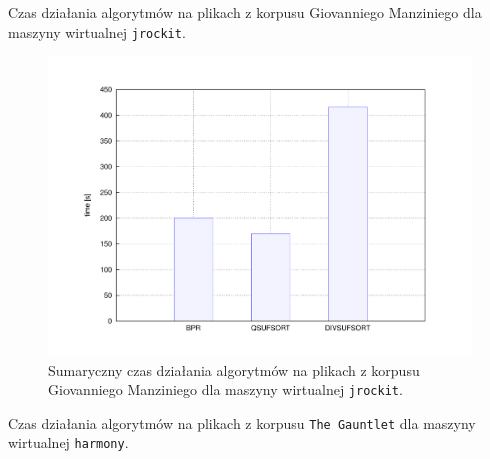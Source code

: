 \begin{table}[p]
	\begin{center}        
 		 
    \end{center}                         
\caption{Czas działania algorytmów na plikach z korpusu Giovanniego Manziniego dla maszyny wirtualnej \texttt{jrockit}.}%
    \label{tab:jrockit-manzini}
\end{table}

\begin{figure}[p]
       \begin{center}
            \includegraphics[width=\linewidth]{figures/results/jrockit-manzini.pdf}
        \end{center}        
	    \caption{Sumaryczny czas działania algorytmów na plikach z korpusu Giovanniego Manziniego dla maszyny wirtualnej \texttt{jrockit}.}%
    \label{rys:jrockit-manzini}
\end{figure} 


\begin{table}[p]
	\begin{center}        
 		
    \end{center}                         
	\caption{Czas działania algorytmów na plikach z korpusu \texttt{The Gauntlet} dla maszyny wirtualnej \texttt{harmony}.}%
    \label{tab:harmony-gauntlet}
\end{table}

